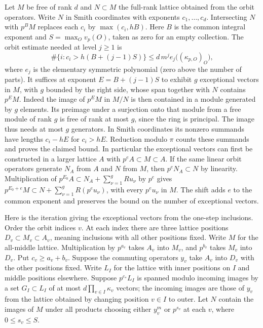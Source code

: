 \documentclass[11pt]{amsart}
\theoremstyle{definition}
\theoremstyle{remark}
\begin{document}
Let $M$ be free of rank $d$ and $N\subset M$ the full-rank lattice
obtained from the orbit operators. Write $N$ in Smith coordinates
with exponents $c_1,\ldots,c_d$. Intersecting $N$ with $p^B M$
replaces each $c_i$ by $\max(c_i,hB)$. Here $B$ is the common
integral exponent and $S=\max_O v_p(O)$, taken as zero for an
empty collection. The orbit estimate needed at level $j\ge1$ is
\[
 \#\{i:c_i>h(B+(j-1)S)\}
       \le d\,m^j e_j\big((\kappa_{p,O})_O\big),
\]
where $e_j$ is the elementary symmetric polynomial (zero above the
number of parts). It suffices at exponent $E=B+(j-1)S$ to exhibit
$g$ exceptional vectors in $M$, with $g$ bounded by the right side,
whose span together with $N$ contains $p^E M$. Indeed the image
of $p^E M$ in $M/N$ is then contained in a module generated by
$g$ elements. Its preimage under a surjection onto that module from
a free module of rank $g$ is free of rank at most $g$, since the
ring is principal. The image thus needs at most $g$ generators.
In Smith coordinates its nonzero summands have lengths $c_i-hE$
for $c_i>hE$. Reduction modulo $\pi$ counts these summands and
proves the claimed bound. In particular the exceptional vectors can
first be constructed in a larger lattice $A$ with
$p^e A\subset M\subset A$. If the same linear orbit operators
generate $N_A$ from $A$ and $N$ from $M$, then $p^eN_A\subset N$
by linearity. Multiplication of
$p^{E_0}A\subset N_A+\sum_{\nu=1}^g R u_\nu$ by $p^e$ gives
$p^{E_0+e}M\subset N+\sum_{\nu=1}^g R(p^e u_\nu)$, with every
$p^eu_\nu$ in $M$. The shift adds $e$ to the common exponent and
preserves the bound on the number of exceptional vectors.

Here is the iteration giving the exceptional vectors from the
one-step inclusions. Order the orbit indices $v$. At each index
there are three lattice positions $D_v\subset M_v\subset A_v$,
meaning inclusions with all other positions fixed. Write $M$ for
the all-middle lattice. Multiplication by $p^{a_v}$ takes $A_v$
into $M_v$, and $p^{b_v}$ takes $M_v$ into $D_v$. Put
$c_v\ge a_v+b_v$. Suppose the commuting operators $y_v$ take
$A_v$ into $D_v$ with the other positions fixed. Write $L_I$ for
the lattice with inner positions on $I$ and middle positions
elsewhere. Suppose $p^{c_*}L_I$ is spanned modulo incoming images
by a set $G_I\subset L_I$ of at most $d\prod_{v\in I}\kappa_v$
vectors; the incoming images are those of $y_v$ from the lattice
obtained by changing position $v\in I$ to outer. Let $N$ contain
the images of $M$ under all products choosing either $y_v^m$ or
$p^{s_v}$ at each $v$, where $0\le s_v\le S$.
\end{document}
